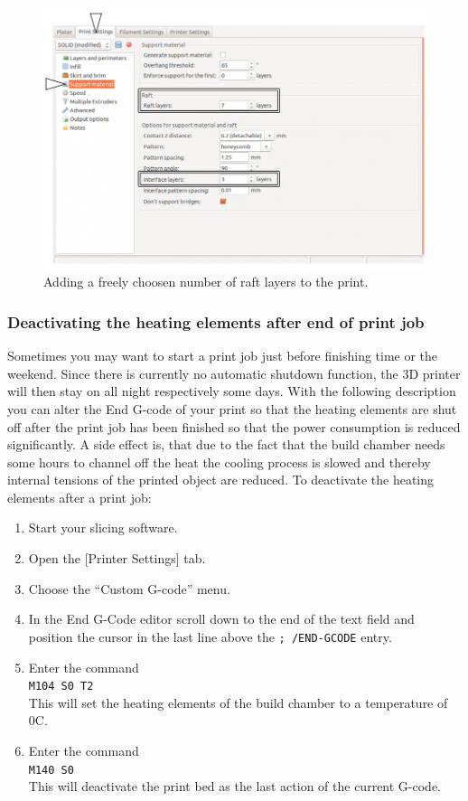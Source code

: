 \begin{figure}[H]
  \centering
  \includegraphics[width=.7\linewidth]{./img/slic3r_adding_raft_layers.png}
  \caption{Adding a freely choosen number of raft layers to the print.}
\end{figure}


\subsubsection{Deactivating the heating elements after end of print job}

Sometimes you may want to start a print job just before finishing time or the weekend. Since there is currently no automatic shutdown function, the 3D printer will then stay on all night respectively some days. With the following description you can alter the End G-code of your print so that the heating elements are shut off after the print job has been finished so that the power consumption is reduced significantly. A side effect is, that due to the fact that the build chamber needs some hours to channel off the heat the cooling process is slowed and thereby internal tensions of the printed object are reduced. To deactivate the heating elements after a print job: 

\begin{enumerate}
  \item Start your slicing software.
  \item Open the [Printer Settings] tab.
  \item Choose the “Custom G-code” menu.
  \item In the End G-Code editor scroll down to the end of the text field and position the 
        cursor in the last line above the \verb|; /END-GCODE| entry.
  \item Enter the command\\
        \verb|M104 S0 T2|\\
        This will set the heating elements of the build chamber to a 
        temperature of 0\degree C.
  \item Enter the command\\
        \verb|M140 S0|\\
        This will deactivate the print bed as the last action of the current G-code.
\end{enumerate}

